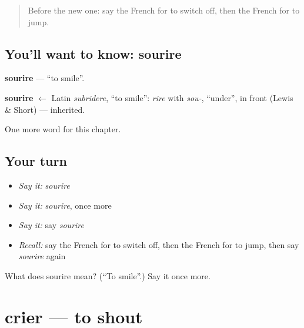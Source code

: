 \label{lesson:FR-C143-sourire}



\begin{quote}
Before the new one: say the French for to switch off, then the French for to jump.
\end{quote}

\subsection*{You'll want to know: sourire}
\textbf{sourire} — \textquotedblleft{}to smile\textquotedblright{}.

\begin{cousinweb}
\textbf{sourire} $\leftarrow$ Latin \emph{subridere}, \textquotedblleft{}to smile\textquotedblright{}: \emph{rire} with \emph{sou-}, \textquotedblleft{}under\textquotedblright{}, in front (Lewis \& Short) — inherited.
\end{cousinweb}

\begin{grammarlens}[title={What you've built}]
One more word for this chapter.
\end{grammarlens}

\subsection*{Your turn}
\begin{itemize}
\raggedright
  \item \emph{Say it:} \emph{sourire}
  \item \emph{Say it:} \emph{sourire}, once more
  \item \emph{Say it:} say \emph{sourire}
  \item \emph{Recall:} say the French for to switch off, then the French for to jump, then say \emph{sourire} again
\end{itemize}

\begin{tcolorbox}[breakable,colback=teal!4,colframe=teal!35!black,title={Before you move on}]
What does sourire mean? (\textquotedblleft{}To smile\textquotedblright{}.) Say it once more.
\end{tcolorbox}
\section[crier]{crier — to shout}

\label{lesson:FR-C143-crier}



